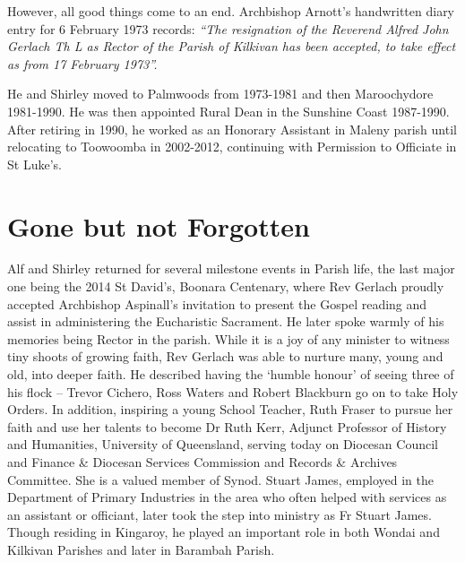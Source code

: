 However, all good things come to an end. Archbishop Arnott's handwritten diary entry for 6 February 1973 records: \emph{``The resignation of the Reverend Alfred John Gerlach Th L as Rector of the Parish of Kilkivan has been accepted, to take effect as from 17 February 1973''.}



He and Shirley moved to Palmwoods from 1973-1981 and then Maroochydore 1981-1990. He was then appointed Rural Dean in the Sunshine Coast 1987-1990. After retiring in 1990, he worked as an Honorary Assistant in Maleny parish until relocating to Toowoomba in 2002-2012, continuing with Permission to Officiate in St Luke's.



\section{Gone but not Forgotten}



Alf and Shirley returned for several milestone events in Parish life, the last major one being the 2014 St David's, Boonara Centenary, where Rev Gerlach proudly accepted Archbishop Aspinall's invitation to present the Gospel reading and assist in administering the Eucharistic Sacrament. He later spoke warmly of his memories being Rector in the parish. While it is a joy of any minister to witness tiny shoots of growing faith, Rev Gerlach was able to nurture many, young and old, into deeper faith. He described having the `humble honour' of seeing three of his flock -- Trevor Cichero, Ross Waters and Robert Blackburn go on to take Holy Orders. In addition, inspiring a young School Teacher, Ruth Fraser to pursue her faith and use her talents to become Dr Ruth Kerr, Adjunct Professor of History and Humanities, University of Queensland, serving today on Diocesan Council and Finance \& Diocesan Services Commission and Records \& Archives Committee. She is a valued member of Synod. Stuart James, employed in the Department of Primary Industries in the area who often helped with services as an assistant or officiant, later took the step into ministry as Fr Stuart James. Though residing in Kingaroy, he played an important role in both Wondai and Kilkivan Parishes and later in Barambah Parish.









